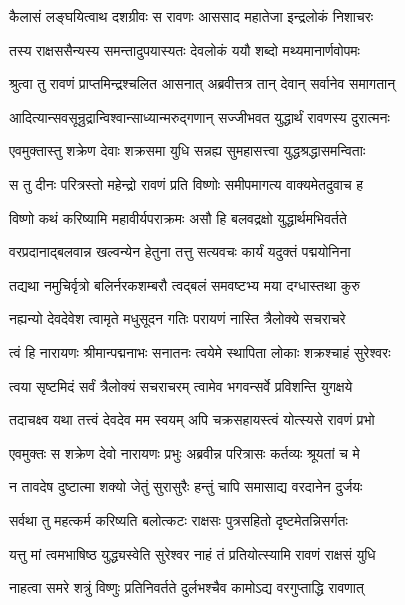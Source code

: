 
\twolineshloka
{कैलासं लङ्घयित्वाथ दशग्रीवः स रावणः}
{आससाद महातेजा इन्द्रलोकं निशाचरः} %

\twolineshloka
{तस्य राक्षससैन्यस्य समन्तादुपयास्यतः}
{देवलोकं ययौ शब्दो मथ्यमानार्णवोपमः} %

\twolineshloka
{श्रुत्वा तु रावणं प्राप्तमिन्द्रश्चलित आसनात्}
{अब्रवीत्तत्र तान् देवान् सर्वानेव समागतान्} %

\twolineshloka
{आदित्यान्सवसून्रुद्रान्विश्वान्साध्यान्मरुद्गणान्}
{सज्जीभवत युद्धार्थं रावणस्य दुरात्मनः} %

\twolineshloka
{एवमुक्तास्तु शक्रेण देवाः शक्रसमा युधि}
{सन्नह्य सुमहासत्त्वा युद्धश्रद्धासमन्विताः} %

\twolineshloka
{स तु दीनः परित्रस्तो महेन्द्रो रावणं प्रति}
{विष्णोः समीपमागत्य वाक्यमेतदुवाच ह} %

\twolineshloka
{विष्णो कथं करिष्यामि महावीर्यपराक्रमः}
{असौ हि बलवद्रक्षो युद्धार्थमभिवर्तते} %

\twolineshloka
{वरप्रदानाद्बलवान्न खल्वन्येन हेतुना}
{तत्तु सत्यवचः कार्यं यदुक्तं पद्मयोनिना} %

\twolineshloka
{तद्यथा नमुचिर्वृत्रो बलिर्नरकशम्बरौ}
{त्वद्बलं समवष्टभ्य मया दग्धास्तथा कुरु} %

\twolineshloka
{नह्यन्यो देवदेवेश त्वामृते मधुसूदन}
{गतिः परायणं नास्ति त्रैलोक्ये सचराचरे} %

\twolineshloka
{त्वं हि नारायणः श्रीमान्पद्मनाभः सनातनः}
{त्वयेमे स्थापिता लोकाः शक्रश्चाहं सुरेश्वरः} %

\twolineshloka
{त्वया सृष्टमिदं सर्वं त्रैलोक्यं सचराचरम्}
{त्वामेव भगवन्सर्वे प्रविशन्ति युगक्षये} %

\twolineshloka
{तदाचक्ष्व यथा तत्त्वं देवदेव मम स्वयम्}
{अपि चक्रसहायस्त्वं योत्स्यसे रावणं प्रभो} %

\twolineshloka
{एवमुक्तः स शक्रेण देवो नारायणः प्रभुः}
{अब्रवीन्न परित्रासः कर्तव्यः श्रूयतां च मे} %

\twolineshloka
{न तावदेष दुष्टात्मा शक्यो जेतुं सुरासुरैः}
{हन्तुं चापि समासाद्य वरदानेन दुर्जयः} %

\twolineshloka
{सर्वथा तु महत्कर्म करिष्यति बलोत्कटः}
{राक्षसः पुत्रसहितो दृष्टमेतन्निसर्गतः} %

\twolineshloka
{यत्तु मां त्वमभाषिष्ठ युद्ध्यस्वेति सुरेश्वर}
{नाहं तं प्रतियोत्स्यामि रावणं राक्षसं युधि} %

\twolineshloka
{नाहत्वा समरे शत्रुं विष्णुः प्रतिनिवर्तते}
{दुर्लभश्चैव कामोऽद्य वरगुप्ताद्धि रावणात्} %

